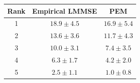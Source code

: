 \begin{tabular}{ccc}
\toprule
Rank & Empirical LMMSE & PEM \\
\midrule
1 & $18.9 \pm 4.5$ & $16.9 \pm 5.4$ \\
2 & $13.6 \pm 3.6$ & $11.7 \pm 4.3$ \\
3 & $10.0 \pm 3.1$ & $7.4 \pm 3.5$ \\
4 & $6.3 \pm 1.7$ & $4.2 \pm 2.0$ \\
5 & $2.5 \pm 1.1$ & $1.0 \pm 0.8$ \\
\bottomrule
\end{tabular}
